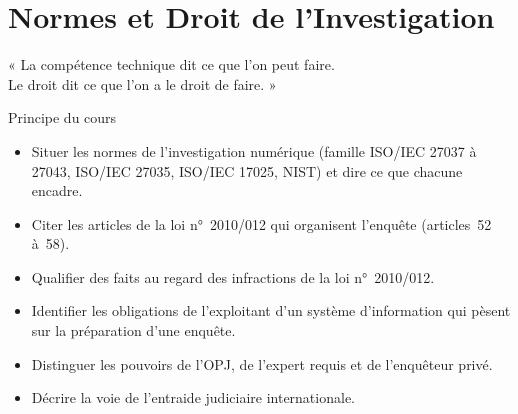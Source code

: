 
\chapter{Normes et Droit de l'Investigation}
\label{chap:normes-droit}

\epigraph{%
    « La compétence technique dit ce que l'on peut faire.\\
    Le droit dit ce que l'on a le droit de faire. »%
}{Principe du cours}


\begin{boxobjectifs}
\begin{itemize}
    \item Situer les normes de l'investigation numérique (famille ISO/IEC
          27037 à 27043, ISO/IEC 27035, ISO/IEC 17025, NIST) et dire ce que
          chacune encadre.
    \item Citer les articles de la loi n°~2010/012 qui organisent l'enquête
          (articles~52 à~58).
    \item Qualifier des faits au regard des infractions de la loi
          n°~2010/012.
    \item Identifier les obligations de l'exploitant d'un système
          d'information qui pèsent sur la préparation d'une enquête.
    \item Distinguer les pouvoirs de l'OPJ, de l'expert requis et de
          l'enquêteur privé.
    \item Décrire la voie de l'entraide judiciaire internationale.
\end{itemize}
\end{boxobjectifs}

